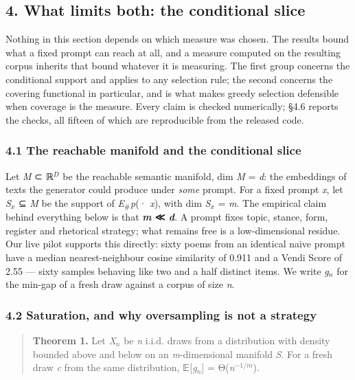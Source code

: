 \documentclass[
  10pt,
]{article}
\theoremstyle{plain}
\theoremstyle{definition}
\begin{document}
\subsection{4. What limits both: the conditional
slice}\label{4-what-limits-both-the-conditional-slice}

Nothing in this section depends on which measure was chosen. The results
bound what a fixed prompt can reach at all, and a measure computed on
the resulting corpus inherits that bound whatever it is measuring. The
first group concerns the conditional support and applies to any
selection rule; the second concerns the covering functional in
particular, and is what makes greedy selection defensible when coverage
is the measure. Every claim is checked numerically; §4.6 reports the
checks, all fifteen of which are reproducible from the released code.

\subsubsection{4.1 The reachable manifold and the conditional
slice}\label{41-the-reachable-manifold-and-the-conditional-slice}

Let \emph{M} ⊂ ℝ\(^{D}\) be the reachable semantic manifold, dim
\emph{M} = \emph{d}: the embeddings of texts the generator could produce
under \emph{some} prompt. For a fixed prompt \emph{x}, let
\emph{S\(_{x}\)} ⊆ \emph{M} be the support of
\emph{E}\(_{\#}\)\emph{p}(· \textbar{} \emph{x}), with dim
\emph{S\(_{x}\)} = \emph{m}. The empirical claim behind everything below
is that \textbf{\emph{m} ≪ \emph{d}}. A prompt fixes topic, stance,
form, register and rhetorical strategy; what remains free is a
low-dimensional residue. Our live pilot supports this directly: sixty
poems from an identical naive prompt have a median nearest-neighbour
cosine similarity of 0.911 and a Vendi Score of 2.55 --- sixty samples
behaving like two and a half distinct items. We write \emph{g\(_{n}\)}
for the min-gap of a fresh draw against a corpus of size \emph{n}.

\subsubsection{4.2 Saturation, and why oversampling is not a
strategy}\label{42-saturation-and-why-oversampling-is-not-a-strategy}

\begin{quote}
\textbf{Theorem 1.} Let \emph{X\(_{n}\)} be \emph{n} i.i.d. draws from a
distribution with density bounded above and below on an
\emph{m}-dimensional manifold \emph{S}. For a fresh draw \emph{c} from
the same distribution, 𝔼{[}\emph{g\(_{n}\)}{]} = Θ(\emph{n}\(^{-1/m}\)).
\end{quote}
\end{document}
